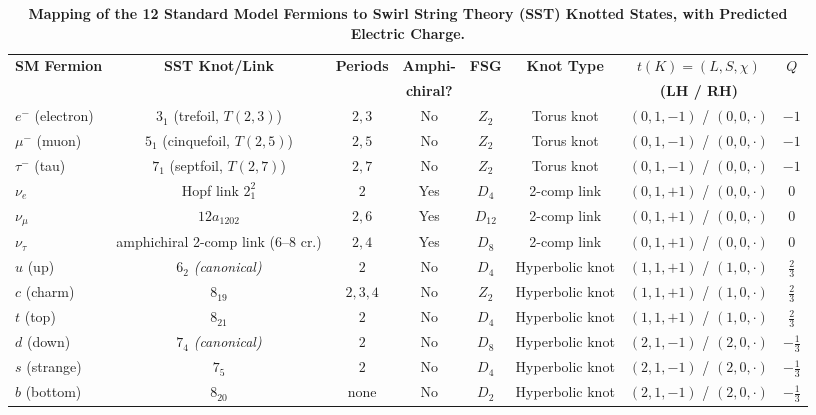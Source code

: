\documentclass[11pt, preprint,titlepage]{revtex4-2}
\begin{document}
\begin{table}[htbp]
\caption{\textbf{Mapping of the 12 Standard Model Fermions to Swirl String Theory (SST) Knotted States, with Predicted Electric Charge.}}
\centering
\renewcommand{\arraystretch}{1.15}
\setlength{\tabcolsep}{0.45em}
\begin{tabular}{lccccccc}
\toprule
\textbf{SM Fermion} & \textbf{SST Knot/Link} & \textbf{Periods} & \textbf{Amphi-} & \textbf{FSG} & \textbf{Knot Type} & \textbf{$t(K)=(L,S,\chi)$} & \textbf{$Q$}\\
&  &  & \textbf{chiral?} &  &  & \textbf{(LH / RH)} &  \\
\midrule
$e^-$ (electron) & $3_1$ (trefoil, $T(2,3)$) & $2,3$ & No & $Z_2$ & Torus knot & $(0,1,-1)$ / $(0,0,\cdot)$ & $-1$ \\
$\mu^-$ (muon)   & $5_1$ (cinquefoil, $T(2,5)$) & $2,5$ & No & $Z_2$ & Torus knot & $(0,1,-1)$ / $(0,0,\cdot)$ & $-1$ \\
$\tau^-$ (tau)   & $7_1$ (septfoil, $T(2,7)$) & $2,7$ & No & $Z_2$ & Torus knot & $(0,1,-1)$ / $(0,0,\cdot)$ & $-1$ \\
\midrule
$\nu_e$          & Hopf link $2^2_1$ & $2$ & Yes & $D_4$ & 2-comp link & $(0,1,+1)$ / $(0,0,\cdot)$ & $0$ \\
$\nu_\mu$        & $12a_{1202}$ & $2,6$ & Yes & $D_{12}$ & 2-comp link & $(0,1,+1)$ / $(0,0,\cdot)$ & $0$ \\
$\nu_\tau$       & amphichiral 2-comp link (6--8 cr.) & $2,4$ & Yes & $D_8$ & 2-comp link & $(0,1,+1)$ / $(0,0,\cdot)$ & $0$ \\
\midrule
$u$ (up)         & $6_2$ \textit{(canonical)} & $2$ & No & $D_4$ & Hyperbolic knot & $(1,1,+1)$ / $(1,0,\cdot)$ & $\tfrac{2}{3}$ \\
$c$ (charm)      & $8_{19}$ & $2,3,4$ & No & $Z_2$ & Hyperbolic knot & $(1,1,+1)$ / $(1,0,\cdot)$ & $\tfrac{2}{3}$ \\
$t$ (top)        & $8_{21}$ & $2$ & No & $D_4$ & Hyperbolic knot & $(1,1,+1)$ / $(1,0,\cdot)$ & $\tfrac{2}{3}$ \\
\midrule
$d$ (down)       & $7_4$ \textit{(canonical)} & $2$ & No & $D_8$ & Hyperbolic knot & $(2,1,-1)$ / $(2,0,\cdot)$ & $-\tfrac{1}{3}$ \\
$s$ (strange)    & $7_5$ & $2$ & No & $D_4$ & Hyperbolic knot & $(2,1,-1)$ / $(2,0,\cdot)$ & $-\tfrac{1}{3}$ \\
$b$ (bottom)     & $8_{20}$ & none & No & $D_2$ & Hyperbolic knot & $(2,1,-1)$ / $(2,0,\cdot)$ & $-\tfrac{1}{3}$ \\
\bottomrule
\end{tabular}
\label{tab:SM12_knot_map}
\end{table}
\end{document}

